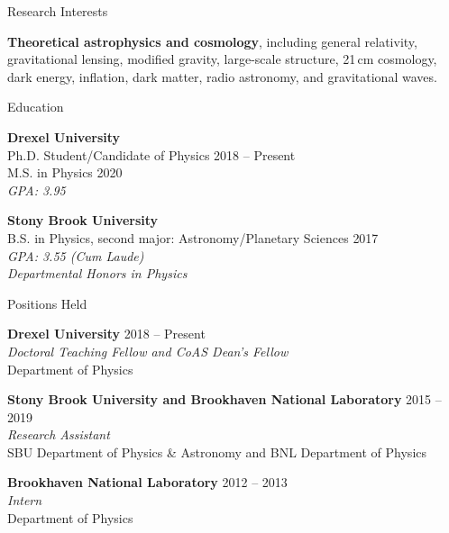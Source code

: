\documentclass{resume} %
\begin{document}


\begin{rSection}{Research Interests}

\textbf{Theoretical astrophysics and cosmology}, including general relativity, gravitational lensing, modified gravity, large-scale structure, 21\,cm cosmology, dark energy, inflation, dark matter, radio astronomy, and gravitational waves. 

\end{rSection}


\begin{rSection}{Education}

\textbf{Drexel University} \\%
{\color{MidnightBlue} Ph.D.} Student/Candidate of Physics \hfill {2018 -- Present} \\
{\color{MidnightBlue} M.S.} in Physics \hfill{2020}\\
\textit{GPA: 3.95}

\textbf{Stony Brook University} \\%
{\color{MidnightBlue} B.S.} in Physics, second major: Astronomy/Planetary Sciences \hfill{2017}\\
\textit{GPA: 3.55 (Cum Laude)}\\
\textit{Departmental Honors in Physics}

\end{rSection}


\begin{rSection}{Positions Held}

\textbf{Drexel University} \hfill {2018 -- Present} \\
\textit{Doctoral Teaching Fellow and CoAS Dean's Fellow}\\
Department of Physics

\textbf{Stony Brook University and Brookhaven National Laboratory} \hfill {2015 -- 2019}\\
\textit{Research Assistant}\\
SBU Department of Physics \& Astronomy  and BNL Department of Physics

\textbf{Brookhaven National Laboratory} \hfill {2012 -- 2013}\\
\textit{Intern}\\
Department of Physics

\end{rSection}
\end{document}
